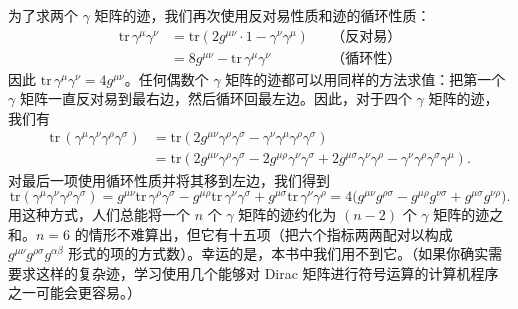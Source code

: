 为了求两个 $\gamma$ 矩阵的迹，我们再次使用反对易性质和迹的循环性质：
\begin{equation}
  \begin{aligned}
    \mathrm{tr}\,\gamma^\mu\gamma^\nu
      &= \mathrm{tr}(2g^{\mu\nu}\cdot 1 - \gamma^\nu\gamma^\mu)
      &&\text{（反对易）}\\
    &= 8g^{\mu\nu} - \mathrm{tr}\,\gamma^\mu\gamma^\nu
      &&\text{（循环性）}
  \end{aligned}
\end{equation}
因此 $\mathrm{tr}\,\gamma^\mu\gamma^\nu = 4g^{\mu\nu}$。任何偶数个 $\gamma$ 矩阵的迹都可以用同样的方法求值：把第一个 $\gamma$ 矩阵一直反对易到最右边，然后循环回最左边。因此，对于四个 $\gamma$ 矩阵的迹，我们有
\begin{equation}
  \begin{aligned}
    \mathrm{tr}\,(\gamma^\mu\gamma^\nu\gamma^\rho\gamma^\sigma)
    &= \mathrm{tr}(2g^{\mu\nu}\gamma^\rho\gamma^\sigma
      - \gamma^\nu\gamma^\mu\gamma^\rho\gamma^\sigma)\\
    &= \mathrm{tr}(2g^{\mu\nu}\gamma^\rho\gamma^\sigma
      - 2g^{\mu\rho}\gamma^\nu\gamma^\sigma
      + 2g^{\mu\sigma}\gamma^\nu\gamma^\rho
      - \gamma^\nu\gamma^\rho\gamma^\sigma\gamma^\mu) .
  \end{aligned}
\end{equation}
对最后一项使用循环性质并将其移到左边，我们得到
\begin{equation}
  \mathrm{tr}(\gamma^\mu\gamma^\nu\gamma^\rho\gamma^\sigma)
    = g^{\mu\nu}\mathrm{tr}\,\gamma^\rho\gamma^\sigma
      - g^{\mu\rho}\mathrm{tr}\,\gamma^\nu\gamma^\sigma
      + g^{\mu\sigma}\mathrm{tr}\,\gamma^\nu\gamma^\rho
    = 4\bigl( g^{\mu\nu}g^{\rho\sigma} - g^{\mu\rho}g^{\nu\sigma}
      + g^{\mu\sigma}g^{\nu\rho} \bigr) .
\end{equation}
用这种方式，人们总能将一个 $n$ 个 $\gamma$ 矩阵的迹约化为 $(n-2)$ 个 $\gamma$ 矩阵的迹之和。$n=6$ 的情形不难算出，但它有十五项（把六个指标两两配对以构成 $g^{\mu\nu}g^{\rho\sigma}g^{\alpha\beta}$ 形式的项的方式数）。幸运的是，本书中我们用不到它。（如果你确实需要求这样的复杂迹，学习使用几个能够对 Dirac 矩阵进行符号运算的计算机程序之一可能会更容易。）

